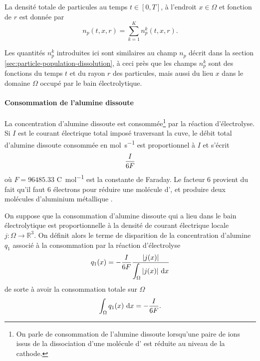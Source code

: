 La densité totale de particules au temps $t \in [0, T]$, à l'endroit
$x\in\Omega$ et fonction de $r$ est donnée par
\begin{equation}\label{eq:populations-sum}
  n_p(t, x, r) = \sum_{k=1}^K n_p^k(t, x, r).
\end{equation}

\begin{remarque}
Les quantités $n_p^k$ introduites ici sont similaires au champ $n_p$
décrit dans la section \ref{sec:particle-population-dissolution}, à
ceci près que les champs $n_p^k$ sont des fonctions du temps $t$ et du
rayon $r$ des particules, mais aussi du lieu $x$ dans le domaine
$\Omega$ occupé par le bain électrolytique.
\end{remarque}

\paragraph{Consommation de l'alumine dissoute}
La concentration d'alumine dissoute est consommée\footnote{On parle de
consommation de l'alumine dissoute lorsqu'une paire de ions  issus de
la dissociation d'une molécule d' est réduite au niveau de
la cathode.} par la réaction
d'électrolyse. Si $I$ est le courant électrique total imposé
traversant la cuve, le débit total d'alumine dissoute consommée en
\si{\mol\per\second} est proportionnel à $I$ et s'écrit
\begin{equation}\label{eq:mass-consumption}
  \frac{I}{6F}
\end{equation}
où $F = \num{96485.33}$ \si{\coulomb\per\mol} est la constante de
Faraday. Le facteur \num{6} provient du fait qu'il
faut \num{6} électrons pour réduire une molécule d', et
produire deux molécules d'aluminium métallique .

On suppose que la consommation d'alumine dissoute qui a lieu dans le
bain électrolytique est proportionnelle à la densité de courant
électrique locale $j:\Omega\to\mathbb R^3$. On définit alors le terme
de disparition de la concentration d'alumine $q_1$ associé à la
consommation par la réaction d'électrolyse
\begin{equation}
  q_1(x) = -\frac{I}{6\faraday} %
  \frac{\abs{j(x)}}{\displaystyle\int_\Omega\abs{j(x)}\intd{x}}
\end{equation}
de sorte à avoir la consommation totale sur $\Omega$
\begin{equation}
  \int_\Omega q_1(x)\,\,\mathrm dx = -\frac{I}{6F}.
\end{equation}

